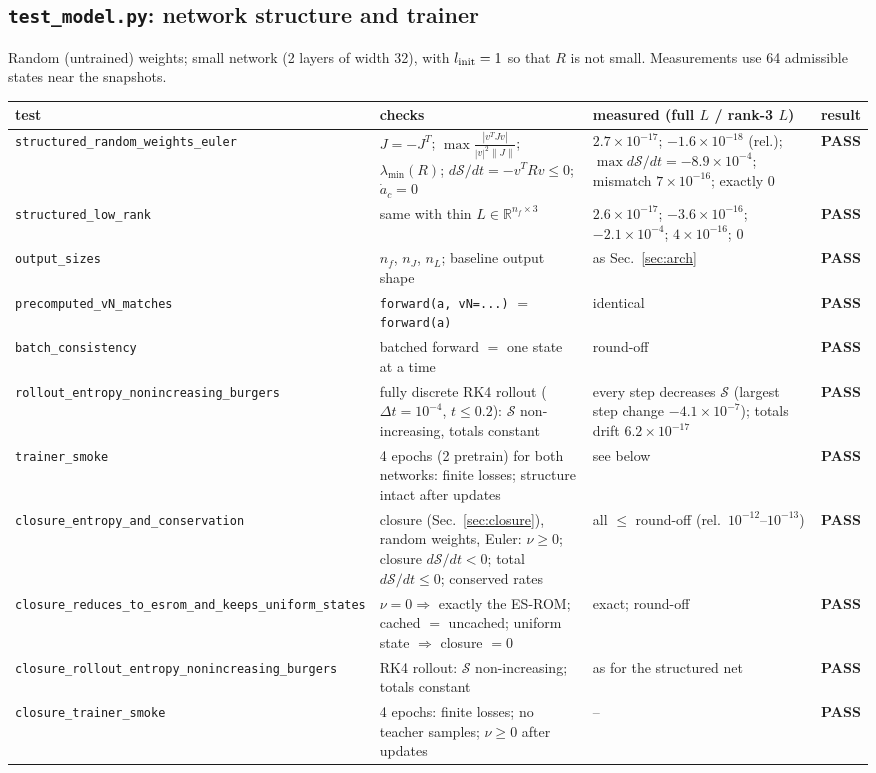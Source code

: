 \documentclass[11pt,a4paper]{article}
\newcommand{\code}[1]{\texttt{\small #1}}
\newcommand{\pass}{\textcolor{green!45!black}{\textbf{PASS}}}
\newcommand{\Sc}{\mathcal S}
\begin{document}
\subsection{\code{test\_model.py}: network structure and trainer}\label{sec:t-model}
Random (untrained) weights; small network (2 layers of width 32), with $l_{\rm init}=1$ so that $R$ is not small. Measurements use 64 admissible states near the snapshots.
\begin{center}\small
\begin{tabular}{p{4.3cm}p{4.8cm}p{4.1cm}c}
\toprule
test & checks & measured (full $L$ / rank-3 $L$) & result\\\midrule
\code{structured\_random\_weights\_euler} & $J=-J^T$; $\max\frac{|v^TJv|}{|v|^2\|J\|}$; $\lambda_{\min}(R)$; $d\Sc/dt=-v^TRv\le0$; $\dot a_c=0$ & $2.7\times10^{-17}$; $-1.6\times10^{-18}$ (rel.); $\max d\Sc/dt=-8.9\times10^{-4}$; mismatch $7\times10^{-16}$; exactly 0 & \pass\\
\code{structured\_low\_rank} & same with thin $L\in\mathbb R^{n_f\times3}$ & $2.6\times10^{-17}$; $-3.6\times10^{-16}$; $-2.1\times10^{-4}$; $4\times10^{-16}$; 0 & \pass\\
\code{output\_sizes} & $n_f$, $n_J$, $n_L$; baseline output shape & as Sec.~\ref{sec:arch} & \pass\\
\code{precomputed\_vN\_matches} & \code{forward(a, vN=...)} $=$ \code{forward(a)} & identical & \pass\\
\code{batch\_consistency} & batched forward $=$ one state at a time & round-off & \pass\\
\code{rollout\_entropy\_nonincreasing\_burgers} & fully discrete RK4 rollout ($\Delta t=10^{-4}$, $t\le0.2$): $\Sc$ non-increasing, totals constant & every step decreases $\Sc$ (largest step change $-4.1\times10^{-7}$); totals drift $6.2\times10^{-17}$ & \pass\\
\code{trainer\_smoke} & 4 epochs (2 pretrain) for both networks: finite losses; structure intact after updates & see below & \pass\\
\code{closure\_entropy\_and\_conservation} & closure (Sec.~\ref{sec:closure}), random weights, Euler: $\nu\ge0$; closure $d\Sc/dt<0$; total $d\Sc/dt\le0$; conserved rates & all $\le$ round-off (rel.\ $10^{-12}$--$10^{-13}$) & \pass\\
\code{closure\_reduces\_to\_esrom\_and\_keeps\_uniform\_states} & $\nu=0\Rightarrow$ exactly the ES-ROM; cached $=$ uncached; uniform state $\Rightarrow$ closure $=0$ & exact; round-off & \pass\\
\code{closure\_rollout\_entropy\_nonincreasing\_burgers} & RK4 rollout: $\Sc$ non-increasing; totals constant & as for the structured net & \pass\\
\code{closure\_trainer\_smoke} & 4 epochs: finite losses; no teacher samples; $\nu\ge0$ after updates & -- & \pass\\
\bottomrule
\end{tabular}
\end{center}
\end{document}
